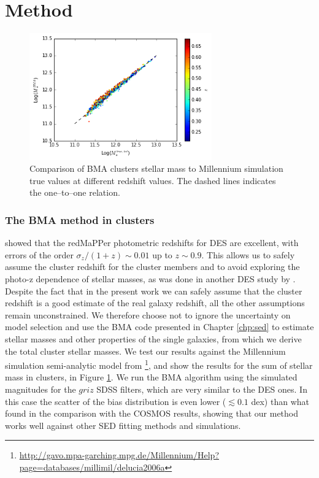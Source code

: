 \section{Method}\label{methodsec}

\begin{figure}\centering\includegraphics[width=0.7\textwidth]{./chapters/chapter5/figs/clusters_smass_true_corrected.png}\caption{Comparison of BMA clusters stellar mass to Millennium simulation true values at different redshift values. The dashed lines indicates the one--to--one relation.}\label{fig:sims}\end{figure}

\subsubsection{The BMA method in clusters}
\citet{redmappersv} showed that  the redMaPPer photometric redshifts for DES  are excellent, with errors of the order $\sigma_z/(1+z)\sim 0.01$ up to $z\sim 0.9$. This allows us to safely assume the cluster redshift for the  cluster members and to avoid exploring the photo-z dependence of stellar masses, as was done in another DES study by \citet{capozzi}.
Despite the fact that in the present work we can safely  assume that the  cluster redshift is a good estimate of the real galaxy redshift, all the other  assumptions remain unconstrained.  We therefore choose not to ignore the uncertainty on model selection and use the BMA code presented in Chapter \ref{chp:sed} to estimate stellar masses and other properties of the single galaxies, from which we derive the total cluster stellar masses.
We test our results against the Millennium simulation semi-analytic model from \citet{delucia}\footnote{\url{http://gavo.mpa-garching.mpg.de/Millennium/Help?page=databases/millimil/delucia2006a}}, and show the results for the sum of stellar mass in clusters, in Figure \ref{fig:sims}. We run the BMA algorithm using the simulated magnitudes for the $griz$ SDSS filters, which are very similar to the DES ones. In this case the scatter of the bias distribution is even lower ($\lesssim 0.1$ dex) than what found in the comparison with the COSMOS results, showing that our method works well against other SED fitting methods and simulations. 

